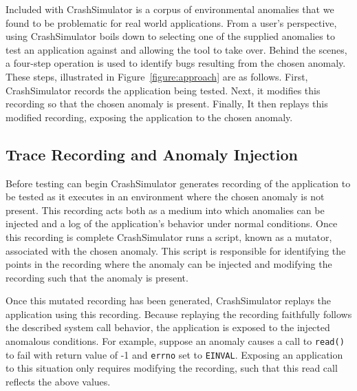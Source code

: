 Included with CrashSimulator is a corpus of environmental anomalies
that we found to be problematic for real world
applications.
From a user's perspective, using CrashSimulator boils down to selecting one
of the supplied anomalies to test an application against and allowing the
tool to take over.  Behind the scenes,
a four-step operation is used to identify bugs resulting from
the chosen anomaly.
These steps, illustrated in Figure~\ref{figure:approach} are as follows.
First, CrashSimulator records the application being tested.  Next, it
modifies this recording so that the chosen anomaly is present.
Finally, It then replays this
modified recording, exposing the application to the chosen anomaly.

\subsection{Trace Recording and Anomaly Injection}

Before testing can begin
CrashSimulator generates recording of the application to be
tested as it executes in an environment where the chosen anomaly is not
present.  This recording acts both as a medium into which anomalies can be
injected and a log of the application's behavior under normal
conditions.  Once this recording is complete CrashSimulator runs a script,
known as a mutator, associated with the chosen anomaly.
This script is responsible for identifying
the points in the recording
where the anomaly can be injected and modifying
the recording such that the anomaly is present.

Once this mutated recording has been generated, CrashSimulator replays the
application using this recording.
Because replaying the
recording faithfully follows the described system call behavior, the
application is exposed to the injected
anomalous conditions.  For
example, suppose an anomaly causes a call to {\tt read()} to fail with
return value of -1 and {\tt errno} set to {\tt EINVAL}.  Exposing an
application to this situation only requires modifying the recording,
such that this read call reflects the above values.

